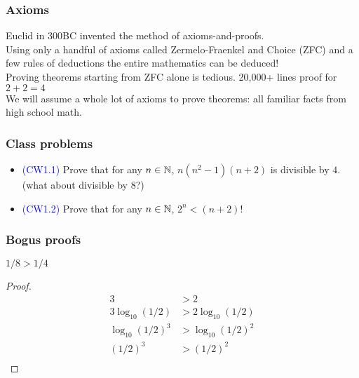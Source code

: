  \begin{frame}[fragile]
\frametitle{Axioms}
Euclid in 300BC invented the method of axioms-and-proofs. \\
\vspace*{0.2in}
Using only a handful of axioms called Zermelo-Fraenkel and Choice (ZFC) and a few rules of deductions
the entire mathematics can be deduced!\\
\vspace*{0.2in}
Proving theorems starting from ZFC alone is tedious. 20,000+ lines proof for $2+2=4$\\
\vspace*{0.2in}
We will assume a whole lot of axioms to prove theorems: all familiar facts from high school math.
\end{frame}

 \begin{frame}[fragile]
\frametitle{Class problems}
\begin{itemize}
\item \textcolor{blue}{(CW1.1)} Prove that for any $n \in {{\mathbb{N}}}$, $n(n^2-1)(n+2)$ is divisible by $4$. (what about divisible by $8$?)
\item \textcolor{blue}{(CW1.2)} Prove that for any $n \in {{\mathbb{N}}}$, $2^n < (n+2)!$ 
\end{itemize}
\end{frame}

 \begin{frame}[fragile]
\frametitle{Bogus proofs}
\begin{theorem}[Bogus]
$1/8 > 1/4$
\end{theorem}
\begin{proof}
\begin{align*}
3 & > 2\\
3 \log_{10} (1/2)& >  2 \log_{10}(1/2)\\
\log_{10} (1/2)^3 & > \log_{10}(1/2)^2\\
(1/2)^3 & > (1/2)^2\\
\end{align*}
\end{proof}
\end{frame}

